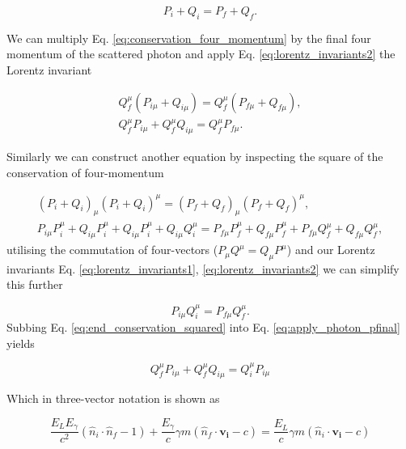 \documentclass[../main.tex]{subfiles}
\begin{document}
\begin{equation}
P_{i} + Q_{i} = P_{f} + Q_{f}.
\label{eq:conservation_four_momentum}
\end{equation}

We can multiply Eq. \ref{eq:conservation_four_momentum} by the final four momentum of the scattered photon and apply Eq. \ref{eq:lorentz_invariants2} the Lorentz invariant 

\begin{align}
Q_{f}^{\mu}\left(P_{i\mu} + Q_{i\mu}\right) = Q_{f}^{\mu}\left(P_{f\mu} + Q_{f\mu}\right), \\
Q_{f}^{\mu}P_{i\mu}+Q_{f}^{\mu}Q_{i\mu} = Q_{f}^{\mu}P_{f\mu}.
\label{eq:apply_photon_pfinal}
\end{align}
 
Similarly we can construct another equation by inspecting the square of the conservation of four-momentum

\begin{align}
\left(P_{i}+Q_{i}\right)_{\mu}\left(P_{i}+Q_{i}\right)^{\mu} = \left(P_{f}+Q_{f}\right)_{\mu}\left(P_{f}+Q_{f}\right)^{\mu}, \\
P_{i\mu}P_{i}^{\mu}+Q_{i\mu}P_{i}^{\mu}+Q_{i\mu}P_{i}^{\mu}+Q_{i\mu}Q_{i}^{\mu} = P_{f\mu}P_{f}^{\mu}+Q_{f\mu}P_{f}^{\mu}+P_{f\mu}Q_{f}^{\mu}+Q_{f\mu}Q_{f}^{\mu},
\label{eq:apply_conservation_squared}
\end{align}
utilising the commutation of four-vectors ($P_{\mu}Q^{\mu} = Q_{\mu}P^{\mu}$) and our Lorentz invariants Eq. \ref{eq:lorentz_invariants1}, \ref{eq:lorentz_invariants2} we can simplify this further

\begin{equation}
P_{i\mu}Q_{i}^{\mu} = P_{f\mu}Q_{f}^{\mu}.
\label{eq:end_conservation_squared}
\end{equation}
Subbing Eq. \ref{eq:end_conservation_squared} into Eq. \ref{eq:apply_photon_pfinal} yields

\begin{equation}
Q_{f}^{\mu}P_{i\mu}+Q_{f}^{\mu}Q_{i\mu} = Q_{i}^{\mu}P_{i\mu}
\label{eq:substitution_four_vector}
\end{equation}

Which in three-vector notation is shown as

\begin{equation}
\frac{E_{L}E_{\gamma}}{c^{2}}\left(\hat{n}_{i}\cdot\hat{n}_{f}-1\right)+\frac{E_{\gamma}}{c}\gamma m\left(\hat{n}_{f}\cdot \boldsymbol{v_{i}}-c\right) = \frac{E_{L}}{c}\gamma m\left(\hat{n}_{i}\cdot \boldsymbol{v_{i}} -c\right)
\label{eq:three_vector_solution}
\end{equation}
\end{document}
